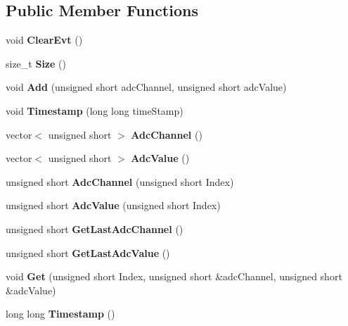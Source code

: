 \subsection*{Public Member Functions}
\begin{DoxyCompactItemize}
\item 
\mbox{\label{class_adc_sub_event_a6921cc7a76de6c57de1f4505aa3a0fc6}} 
void {\bfseries Clear\+Evt} ()
\item 
\mbox{\label{class_adc_sub_event_aefa9fcc6a598d13e775ef6ab3a4c8d57}} 
size\+\_\+t {\bfseries Size} ()
\item 
\mbox{\label{class_adc_sub_event_afff9f0777f4eed5da2e596d65247d1ff}} 
void {\bfseries Add} (unsigned short adc\+Channel, unsigned short adc\+Value)
\item 
\mbox{\label{class_adc_sub_event_a9ae27303e054dc233160f03360f5d9db}} 
void {\bfseries Timestamp} (long long time\+Stamp)
\item 
\mbox{\label{class_adc_sub_event_ae9b2f13ea3c9f93a5ad9c976aacd986e}} 
vector$<$ unsigned short $>$ {\bfseries Adc\+Channel} ()
\item 
\mbox{\label{class_adc_sub_event_ac35e71c13f62eff54dff047c81dc87e1}} 
vector$<$ unsigned short $>$ {\bfseries Adc\+Value} ()
\item 
\mbox{\label{class_adc_sub_event_acbd64195813827ddec628afa090978cf}} 
unsigned short {\bfseries Adc\+Channel} (unsigned short Index)
\item 
\mbox{\label{class_adc_sub_event_a076eeb66b1edcde4fa6bce1a3c5c2bb1}} 
unsigned short {\bfseries Adc\+Value} (unsigned short Index)
\item 
\mbox{\label{class_adc_sub_event_a3afbce187c753a266f05f56e0d46897d}} 
unsigned short {\bfseries Get\+Last\+Adc\+Channel} ()
\item 
\mbox{\label{class_adc_sub_event_a14dcc9cc0d97fef0b80303ac7776019c}} 
unsigned short {\bfseries Get\+Last\+Adc\+Value} ()
\item 
\mbox{\label{class_adc_sub_event_ac49b638c7d81d251300a7d65a9c33e11}} 
void {\bfseries Get} (unsigned short Index, unsigned short \&adc\+Channel, unsigned short \&adc\+Value)
\item 
\mbox{\label{class_adc_sub_event_ab76f954140f4aea1baac5bc2a109f558}} 
long long {\bfseries Timestamp} ()
\end{DoxyCompactItemize}
